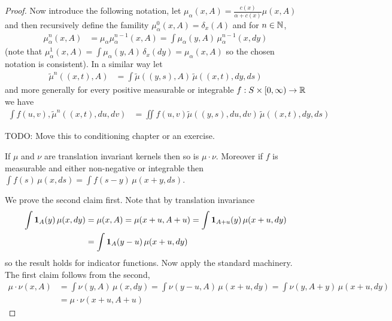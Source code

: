\begin{proof}
Now introduce the following notation, let $\mu_\alpha(x,A) = \frac{c(x)}{\alpha + c(x)} \mu(x,A)$ and then recursively define the famility $\mu_\alpha^0(x, A) = \delta_x(A)$ and for $n \in \mathbb{N}$,
\begin{align*}
\mu_\alpha^n (x,A) &= \mu_\alpha \mu_\alpha^{n-1}(x,A) = \int \mu_\alpha(y, A) \, \mu_\alpha^{n-1}(x, dy)
\end{align*}
(note that $\mu_\alpha^1(x,A) = \int \mu_\alpha(y, A) \, \delta_x(dy) = \mu_\alpha(x,A)$ so the chosen notation is consistent).  In a similar way let 
\begin{align*}
\tilde{\mu}^n((x,t), A) &= \int \tilde{\mu}((y,s), A) \, \tilde{\mu}((x,t), dy, ds)
\end{align*}
and more generally for every positive measurable or integrable $f  : S \times [0,\infty) \to \mathbb{R}$ we have
\begin{align*}
\int f(u,v) , \tilde{\mu}^n((x,t), du, dv) &= \iint f(u,v) \tilde{\mu}((y,s), du, dv) \, \tilde{\mu}((x,t), dy, ds)
\end{align*}

TODO: Move this to conditioning chapter or an exercise.
\begin{clm}If $\mu$ and $\nu$ are translation invariant kernels then so is $\mu \cdot \nu$.  Moreover if $f$ is measurable  and either non-negative or integrable then $\int f(s) \, \mu(x, ds) = \int f(s-y) \, \mu(x+y, ds)$.
\end{clm}
We prove the second claim first.  Note that by translation invariance 
\begin{align*}
\int \textbf{1}_{A}(y) \, \mu(x,dy) &= \mu(x,A) = \mu(x+u, A+u) = \int \textbf{1}_{A+u}(y) \, \mu(x+u,dy) \\
&= \int \textbf{1}_{A}(y-u) \, \mu(x+u,dy)
\end{align*}
so the result holds for indicator functions.  Now apply the standard machinery.  The first claim follows from the second,
\begin{align*}
\mu \cdot \nu (x, A) &= \int \nu(y, A) \, \mu(x, dy) = \int \nu(y - u, A) \, \mu(x + u, dy) = \int \nu(y, A+y) \, \mu(x+u, dy) \\
&= \mu \cdot \nu (x+u, A+u)
\end{align*}



\end{proof}
